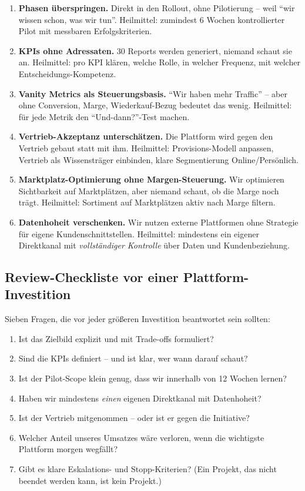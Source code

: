 \documentclass[11pt,a4paper,oneside]{article}
\newcommand{\fachbegriff}[1]{\textbf{#1}}
\begin{document}
\begin{enumerate}
  \item \fachbegriff{Phasen überspringen.} Direkt in den Rollout, ohne Pilotierung -- weil ``wir wissen schon, was wir tun''. Heilmittel: zumindest 6 Wochen kontrollierter Pilot mit messbaren Erfolgskriterien.
  \item \fachbegriff{KPIs ohne Adressaten.} 30 Reports werden generiert, niemand schaut sie an. Heilmittel: pro KPI klären, welche Rolle, in welcher Frequenz, mit welcher Entscheidungs-Kompetenz.
  \item \fachbegriff{Vanity Metrics als Steuerungs­basis.} ``Wir haben mehr Traffic'' -- aber ohne Conversion, Marge, Wiederkauf-Bezug bedeutet das wenig. Heilmittel: für jede Metrik den ``Und-dann?''-Test machen.
  \item \fachbegriff{Vertrieb-Akzeptanz unterschätzen.} Die Plattform wird gegen den Vertrieb gebaut statt mit ihm. Heilmittel: Provisions-Modell anpassen, Vertrieb als Wissensträger einbinden, klare Segmentierung Online/Persönlich.
  \item \fachbegriff{Marktplatz-Optimierung ohne Margen-Steuerung.} Wir optimieren Sichtbarkeit auf Marktplätzen, aber niemand schaut, ob die Marge noch trägt. Heilmittel: Sortiment auf Marktplätzen aktiv nach Marge filtern.
  \item \fachbegriff{Datenhoheit verschenken.} Wir nutzen externe Plattformen ohne Strategie für eigene Kunden­schnittstellen. Heilmittel: mindestens ein eigener Direktkanal mit \emph{vollständiger Kontrolle} über Daten und Kundenbeziehung.
\end{enumerate}

\subsection{Review-Checkliste vor einer Plattform-Investition}

Sieben Fragen, die vor jeder größeren Investition beantwortet sein sollten:

\begin{enumerate}
  \item Ist das Zielbild explizit und mit Trade-offs formuliert?
  \item Sind die KPIs definiert -- und ist klar, wer wann darauf schaut?
  \item Ist der Pilot-Scope klein genug, dass wir innerhalb von 12 Wochen lernen?
  \item Haben wir mindestens \emph{einen} eigenen Direktkanal mit Datenhoheit?
  \item Ist der Vertrieb mitgenommen -- oder ist er gegen die Initiative?
  \item Welcher Anteil unseres Umsatzes wäre verloren, wenn die wichtigste Plattform morgen wegfällt?
  \item Gibt es klare Eskalations- und Stopp-Kriterien? (Ein Projekt, das nicht beendet werden kann, ist kein Projekt.)
\end{enumerate}
\end{document}
